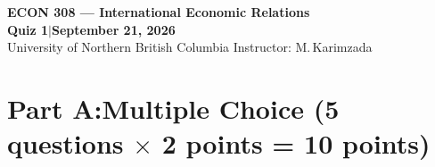 \documentclass[11pt]{article}
\begin{document}

\begin{center}
{\LARGE\bfseries\color{UNBCDark}ECON 308 \;—\; International Economic Relations}\\[0.5em]
{\large\bfseries Quiz 1\quad\textcolor{UNBCGold}{$|$}\quad September 21, 2026}\\[0.2em]
{\small University of Northern British Columbia\quad
 Instructor: M.\,Karimzada}
\end{center}

\vspace{0.4em}

\vspace{0.6em}



\vspace{0.6em}



\section{Part A:\enspace Multiple Choice\quad\normalfont\small
         (5 questions $\times$ 2 points = 10 points)}



\bigskip

\end{document}
